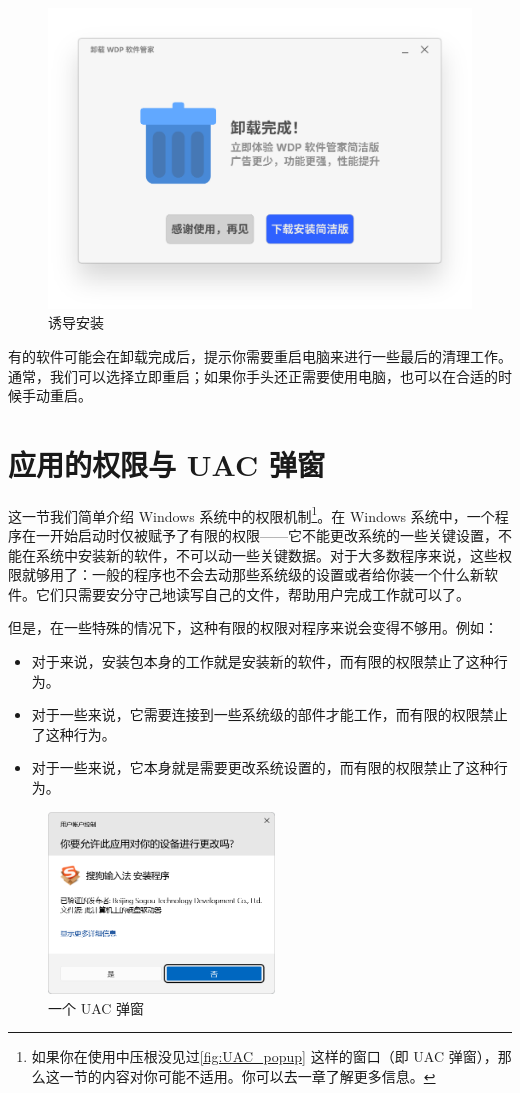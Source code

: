 \begin{figure}[htb!]
  \centering
  \includegraphics[width=.6\textwidth]{assets/basic/WDP_software_manager.pdf}
  \caption{诱导安装}
  \label{Confusing_Uninstall}
\end{figure}

有的软件可能会在卸载完成后，提示你需要重启电脑来进行一些最后的清理工作。通常，我们可以选择立即重启；如果你手头还正需要使用电脑，也可以在合适的时候手动重启。

\section{应用的权限与 UAC 弹窗}

这一节我们简单介绍 Windows 系统中的权限机制\footnote{如果你在使用中压根没见过\autoref{fig:UAC_popup} 这样的窗口（即 UAC 弹窗），那么这一节的内容对你可能不适用。你可以去一章了解更多信息。}。在 Windows 系统中，一个程序在一开始启动时仅被赋予了有限的权限——它不能更改系统的一些关键设置，不能在系统中安装新的软件，不可以动一些关键数据。对于大多数程序来说，这些权限就够用了：一般的程序也不会去动那些系统级的设置或者给你装一个什么新软件。它们只需要安分守己地读写自己的文件，帮助用户完成工作就可以了。

但是，在一些特殊的情况下，这种有限的权限对程序来说会变得不够用。例如：

\begin{itemize}
  \item 对于来说，安装包本身的工作就是安装新的软件，而有限的权限禁止了这种行为。
  \item 对于一些来说，它需要连接到一些系统级的部件才能工作，而有限的权限禁止了这种行为。
  \item 对于一些来说，它本身就是需要更改系统设置的，而有限的权限禁止了这种行为。
\end{itemize}

\begin{figure}
  \centering
  \includegraphics[width=6cm]{assets/basic/UAC_popup.png}
  \caption{一个 UAC 弹窗}
  \label{fig:UAC_popup}
\end{figure}

